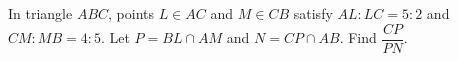 In triangle $ABC$, points $L\in AC$ and $M\in CB$ satisfy $AL:LC=5:2$ and $CM:MB=4:5$. Let $P=BL\cap AM$ and $N=CP\cap AB$. Find $\dfrac{CP}{PN}$.
